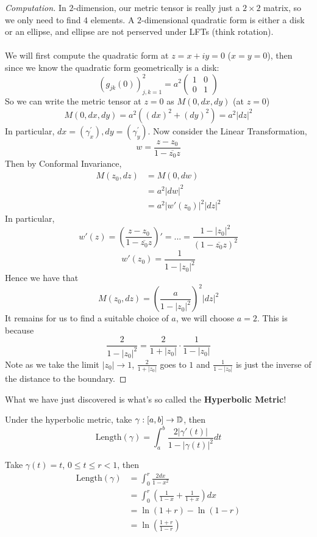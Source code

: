 \begin{proof}[Computation]
    In $2$-dimension, our metric tensor is really just a $2 \times 2$ matrix, so we only need to find $4$ elements. A $2$-dimensional quadratic form is either a disk or an ellipse, and ellipse are not perserved under LFTs (think rotation).\\\\
    We will first compute the quadratic form at $z = x + iy = 0$ ($x = y = 0$), then since we know the quadratic form geometrically is a disk:
    \[(g_{jk}(0))_{j, k = 1}^2 = a^2 \begin{pmatrix}
        1 & 0\\
        0 & 1
    \end{pmatrix}\]
    So we can write the metric tensor at $z = 0$ as $M(0, dx, dy)$ (at $z = 0$)
    \[M(0, dx, dy) = a^2 ((dx)^2 + (dy)^2) = a^2 |dz|^2\]
    In particular, $dx = (\gamma_x^'), dy = (\gamma_y^')$. Now consider the Linear Transformation, 
    \[w = \frac{z - z_0}{1 - \overline{z_0} z}\]
    Then by Conformal Invariance,
    \begin{align*}
        M(z_0, dz) &= M(0, dw)\\
        &= a^2 |dw|^2\\
        &= a^2 |w'(z_0)|^2 |dz|^2 \tag*{Change of variables}
    \end{align*}
    In particular,
    \[w'(z) = (\frac{z - z_0}{1 - \overline{z_0} z})' = ... = \frac{1 - |z_0|^2}{(1 - \overline{z_0} z)^2}\]
    \[w'(z_0) = \frac{1}{1 - |z_0|^2}\]
    Hence we have that
    \[M(z_0, dz) =  (\frac{a}{1 - |z_0|^2})^2 |dz|^2\]
    It remains for us to find a suitable choice of $a$, we will choose $a = 2$. This is because
    \[\frac{2}{1 - |z_0|^2} = \frac{2}{1 + |z_0|} \cdot \frac{1}{1 - |z_0|}\]
    Note as we take the limit $|z_0| \to 1$, $\frac{2}{1 + |z_0|} $ goes to $1$ and $\frac{1}{1 - |z_0|}$ is just the inverse of the distance to the boundary.
\end{proof}

What we have just discovered is what's so called the \textbf{Hyperbolic Metric}!

\begin{definition}
    Under the hyperbolic metric, take $\gamma: [a, b] \to \mathbb{D}$, then
    \[\text{Length}(\gamma) = \int_a^b \frac{2 |\gamma'(t)|}{1 - |\gamma(t)|^2} dt\]
\end{definition}

\begin{example}
    Take $\gamma(t) = t$, $0 \leq t \leq r < 1$, then
    \begin{align*}
        \text{Length}(\gamma) &= \int_0^r \frac{2 dx}{1 - x^2}\\
        &= \int_0^r (\frac{1}{1 - x} + \frac{1}{1 + x}) dx\\
        &= \ln(1 + r) - \ln(1 - r)\\
        &= \ln(\frac{1 + r}{1 - r})
    \end{align*}
\end{example}

